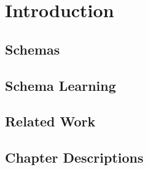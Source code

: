 \chapter{Introduction}

\section{Schemas}

\section{Schema Learning}

\section{Related Work}

\section{Chapter Descriptions}